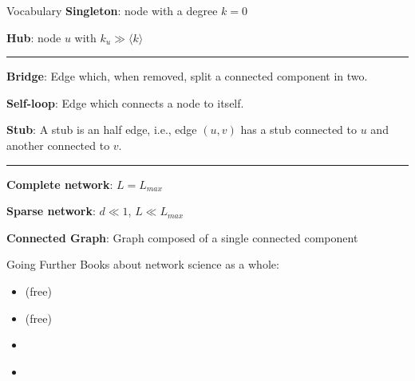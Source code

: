 \begin{textbox}{Vocabulary}
    \textbf{Singleton}: node with a degree $k=0$

    \textbf{Hub}: node $u$ with $k_u \gg \langle k \rangle$

    \noindent\rule{4cm}{0.1pt}

    \textbf{Bridge}: Edge which, when removed, split a connected component in two.

    \textbf{Self-loop}: Edge which connects a node to itself.

    \textbf{Stub}: A stub is an half edge, i.e., edge $(u,v)$ has a stub connected to $u$ and another connected to $v$.

    \noindent\rule{4cm}{0.1pt}

    \textbf{Complete network}: $L=L_{max}$

    \textbf{Sparse network}: $d \ll 1$, $ L \ll L_{max}$

    \textbf{Connected Graph}: Graph composed of a single connected component
\end{textbox}


\begin{textbox}{Going Further}
    Books about network science as a whole:
    \begin{itemize}
        \item\cite{barabasi2016network} (free)
        \item \cite{coscia2021atlas} (free)
        \item \cite{zinoviev2018complex}
        \item \cite{menczer2020first}
    \end{itemize}
\end{textbox}